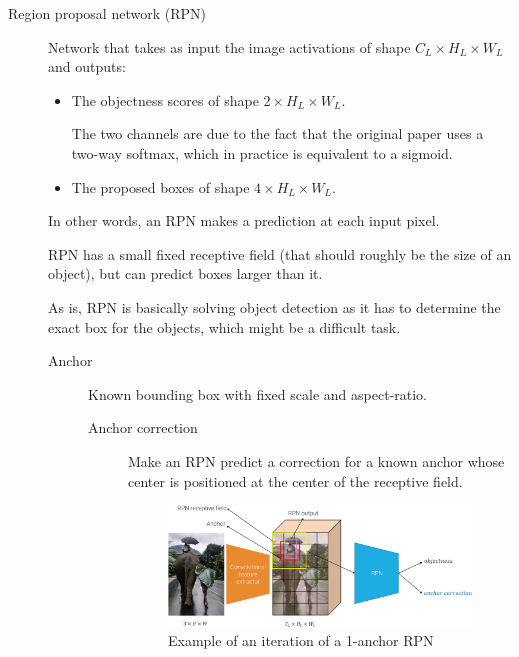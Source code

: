 \begin{description}
        \begin{description}
            \item[Region proposal network (RPN)] 
            Network that takes as input the image activations of shape $C_L \times H_L \times W_L$ and outputs:
            \begin{itemize}
                \item The objectness scores of shape $2 \times H_L \times W_L$.
                    \begin{remark}
                        The two channels are due to the fact that the original paper uses a two-way softmax, which in practice is equivalent to a sigmoid.
                    \end{remark}
                \item The proposed boxes of shape $4 \times H_L \times W_L$.
            \end{itemize}
            In other words, an RPN makes a prediction at each input pixel.

            \begin{remark}
                RPN has a small fixed receptive field (that should roughly be the size of an object), but can  predict boxes larger than it.
            \end{remark}

            \begin{remark}
                As is, RPN is basically solving object detection as it has to determine the exact box for the objects, which might be a difficult task.
            \end{remark}

            \begin{description}
                \item[Anchor] 
                    Known bounding box with fixed scale and aspect-ratio.

                \begin{description}
                    \item[Anchor correction] 
                        Make an RPN predict a correction for a known anchor whose center is positioned at the center of the receptive field.

                        \begin{figure}[H]
                            \raggedleft
                            \includegraphics[width=0.8\linewidth]{./img/_rpn_anchor.jpg}
                            \caption{Example of an iteration of a 1-anchor RPN}
                        \end{figure}


\end{description}
\end{description}
\end{description}
\end{description}
